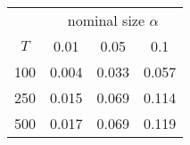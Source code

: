 % 
\begin{tabular}{cccc}
  \hline
  & \multicolumn{3}{c}{nominal size $\alpha$} \\
 $T$ & 0.01 & 0.05 & 0.1 \\
 \hline
100 & 0.004 & 0.033 & 0.057 \\ 
  250 & 0.015 & 0.069 & 0.114 \\ 
  500 & 0.017 & 0.069 & 0.119 \\ 
   \hline
\end{tabular}
